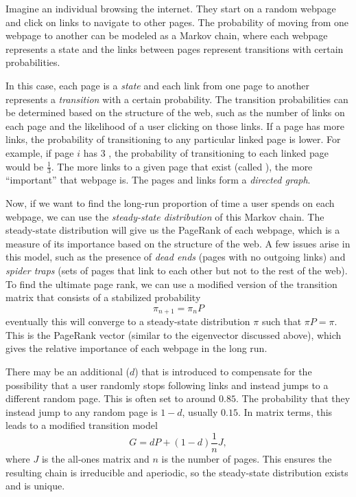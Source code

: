 Imagine an individual browsing the internet. They start on a random webpage and click on links to navigate to other pages. The probability of moving from one webpage to another can be modeled as a Markov chain, where each webpage represents a state and the links between pages represent transitions with certain probabilities.

In this case, each page is a \emph{state} and each link from one page to another represents a \emph{transition} with a certain probability. The transition probabilities can be determined based on the structure of the web, such as the number of links on each page and the likelihood of a user clicking on those links. If a page has more links, the probability of transitioning to any particular linked page is lower. For example, if page $i$ has 3 , the probability of transitioning to each linked page would be $\frac{1}{3}$. The more links to a given page that exist (called ), the more ``important'' that webpage is. The pages and links form a \emph{directed graph}.

Now, if we want to find the long-run proportion of time a user spends on each webpage, we can use the \emph{steady-state distribution} of this Markov chain. The steady-state distribution will give us the PageRank of each webpage, which is a measure of its importance based on the structure of the web. A few issues arise in this model, such as the presence of \emph{dead ends} (pages with no outgoing links) and \emph{spider traps} (sets of pages that link to each other but not to the rest of the web). To find the ultimate page rank, we can use a modified version of the transition matrix that consists of a stabilized probability
\[
    \pi_{n+1} = \pi_n P
\]
eventually this will converge to a steady-state distribution $\pi$ such that $\pi P = \pi$. This is the PageRank vector (similar to the eigenvector discussed above), which gives the relative importance of each webpage in the long run.

There may be an additional  ($d$) that is introduced to compensate for the possibility that a user randomly stops following links and instead jumps to a different random page. This is often set to around $0.85$. The probability that they instead jump to any random page is $1 - d$, usually $0.15$. In matrix terms, this leads to a modified transition model
\[
    G = dP + (1-d)\frac{1}{n}J,
\]
where $J$ is the all-ones matrix and $n$ is the number of pages. This ensures the resulting chain is irreducible and aperiodic, so the steady-state distribution exists and is unique.
